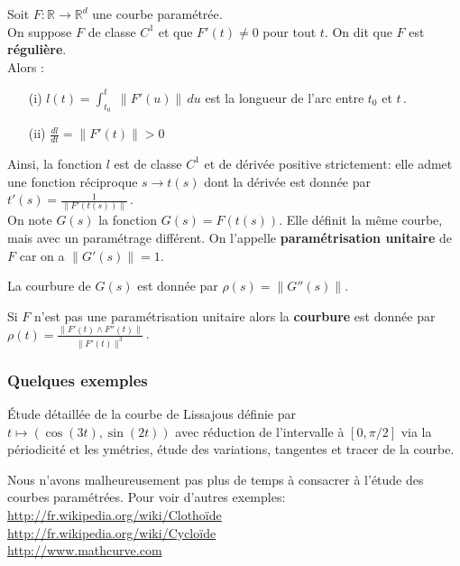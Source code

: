 \documentclass[12pt, class=report,crop=false]{standalone}
\begin{document}
\vskip 5mm




Soit $F : \mathbb{R} \rightarrow \mathbb{R}^d$ une courbe paramétrée. \\
On suppose $F$ de classe $C^1$ et que $F'(t) \neq 0$ pour tout $t$.
On dit que $F$ est {\bf réguli\`ere}. \\
Alors :
\begin{enumerate}
\item[(i)] $l(t) = \displaystyle \int_{t_{0}}^t\; \|F' (u)\|\, du$ est la longueur de l'arc entre $t_{0}$ et $t$\,.
\item[(ii)] $\displaystyle \frac{dl}{dt} = \|F'(t)\| > 0$
\end{enumerate}



Ainsi, la fonction $l$ est de classe $C^1$ et de dérivée positive strictement: elle admet une fonction réciproque $s \rightarrow t(s)$ dont la dérivée est donnée par $t'(s) = \displaystyle \frac{1}{\|F'(t(s))\|}$\,.\\
On note $G(s)$ la fonction $G(s) = F(t(s))$. Elle définit la m\^eme courbe, mais avec un paramétrage différent. On l'appelle {\bf paramétrisation unitaire} de $F$ car on a $\|G'(s)\| = 1$.


\begin{definition}
La courbure de $G (s)$ est donnée par $\rho(s) = \|G''(s)\|$.
\end{definition}

\begin{proposition} Si $F$ n'est pas une paramétrisation unitaire alors la {\bf courbure} est donnée par $\displaystyle \rho(t) = \frac{\|F'(t) \land F''(t)\|}{\|F'(t)\|^3}$\,.
\end{proposition}





\subsubsection{Quelques exemples}
\'Etude détaillée de la courbe de Lissajous définie par $t\mapsto (\cos (3t),\sin (2t))$ avec réduction de l'intervalle \`a $[0,\pi/2]$ via la périodicité et les ymétries, étude des variations, tangentes et tracer de la courbe.









Nous n'avons malheureusement pas plus de temps \`a consacrer \`a l'étude des courbes paramétrées. Pour voir d'autres exemples:\\
\url{http://fr.wikipedia.org/wiki/Clothoïde}\\
\url{http://fr.wikipedia.org/wiki/Cycloïde}\\
\url{http://www.mathcurve.com}
\end{document}
